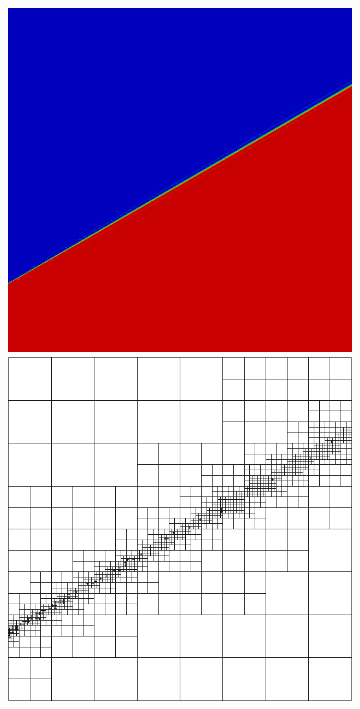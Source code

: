 \documentclass[letterpaper]{article}
\begin{document}
\begin{figure}
\centering
\begin{subfigure}[t]{0.45\textwidth}
\centering
\includegraphics[width=\textwidth]{figs/InnerLayer/graph8c.png}
\includegraphics[width=\textwidth]{figs/InnerLayer/graph8c_mesh.png}

\end{subfigure}
\end{figure}
\end{document}

